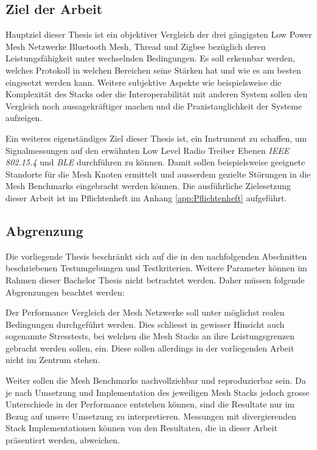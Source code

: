 \subsection{Ziel der Arbeit}\label{subsec:ZielderArbeit}
Hauptziel dieser Thesis ist ein objektiver Vergleich der drei gängigsten Low Power Mesh Netzwerke Bluetooth Mesh, Thread und Zigbee bezüglich deren Leistungsfähigkeit unter wechselnden Bedingungen.
Es soll erkennbar werden, welches Protokoll in welchen Bereichen seine Stärken hat und wie es am besten eingesetzt werden kann.
Weitere subjektive Aspekte wie beispielsweise die Komplexität des Stacks oder die Interoperabilität mit anderen System sollen den Vergleich noch aussagekräftiger machen und die Praxistauglichkeit der Systeme aufzeigen.

Ein weiteres eigenständiges Ziel dieser Thesis ist, ein Instrument zu schaffen, um Signalmessungen auf den erwähnten Low Level Radio Treiber Ebenen \textit{IEEE 802.15.4} und \textit{BLE} durchführen zu können. Damit sollen beispielsweise geeignete Standorte für die Mesh Knoten ermittelt und ausserdem gezielte Störungen in die Mesh Benchmarks eingebracht werden können.
Die ausführliche Zielesetzung dieser Arbeit ist im Pflichtenheft im Anhang \ref{app:Pflichtenheft} aufgeführt.

\subsection{Abgrenzung}\label{sec:Abgrenzung}
Die vorliegende Thesis beschränkt sich auf die in den nachfolgenden Abschnitten beschriebenen Testumgebungen und Testkriterien. Weitere Parameter können im Rahmen dieser Bachelor Thesis nicht betrachtet werden.
Daher müssen folgende Abgrenzungen beachtet werden:

Der Performance Vergleich der Mesh Netzwerke soll unter möglichst realen Bedingungen durchgeführt werden. Dies schliesst in gewisser Hinsicht auch sogenannte Stresstests, bei welchen die Mesh Stacks an ihre Leistungsgrenzen gebracht werden sollen, ein. Diese sollen allerdings in der vorliegenden Arbeit nicht im Zentrum stehen.

Weiter sollen die Mesh Benchmarks nachvollziehbar und reproduzierbar sein. Da je nach Umsetzung und Implementation des jeweiligen Mesh Stacks jedoch grosse Unterschiede in der Performance entstehen können, sind die Resultate nur im Bezug auf unsere Umsetzung zu interpretieren. Messungen mit divergierenden Stack Implementationen können von den Resultaten, die in dieser Arbeit präsentiert werden, abweichen.

